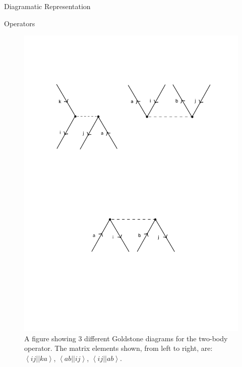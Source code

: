 \documentclass[twoside,english]{uiofysmaster}
\begin{document}
\begin{chapter}{Diagramatic Representation}
\begin{section}{Operators}
		\begin{figure}[H]
			\includegraphics[width=\textwidth]{Figures/TwoBodyOperator2.pdf}
			\caption{A figure showing 3 different Goldstone diagrams for the two-body operator. The matrix elements shown, from left to right, are:
			$\left<ij||ka\right>$, $\left<ab||ij\right>$, $\left<ij||ab\right>$.}
			\label{Figure:TwoBodyOperator2}
		\end{figure}

	\end{section}


\end{chapter}
\end{document}
